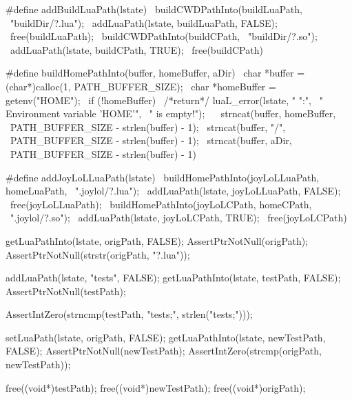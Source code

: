 #define addBuildLuaPath(lstate)            \
  buildCWDPathInto(buildLuaPath,           \
    "buildDir/?.lua");                     \
  addLuaPath(lstate, buildLuaPath, FALSE); \
  free(buildLuaPath);                      \
  buildCWDPathInto(buildCPath,             \
    "buildDir/?.so");                      \
  addLuaPath(lstate, buildCPath, TRUE);    \
  free(buildCPath)
  
#define buildHomePathInto(buffer, homeBuffer, aDir)     \
  char *buffer = (char*)calloc(1, PATH_BUFFER_SIZE);    \
  char *homeBuffer = getenv("HOME");                    \
  if (!homeBuffer) {                                    \
    /*return*/ luaL_error(lstate, "%
      "\nERROR:\n",                                     \
      "  Environment variable 'HOME'\n",                \
      "  is empty!\n\n");                               \
  }                                                     \
  strncat(buffer, homeBuffer,                           \
    PATH_BUFFER_SIZE - strlen(buffer) - 1);             \
  strncat(buffer, "/",                                  \
    PATH_BUFFER_SIZE - strlen(buffer) - 1);             \
  strncat(buffer, aDir,                                 \
    PATH_BUFFER_SIZE - strlen(buffer) - 1)

#define addJoyLoLLuaPath(lstate)                 \
  buildHomePathInto(joyLoLLuaPath, homeLuaPath,  \
    ".joylol/?.lua");                            \
  addLuaPath(lstate, joyLoLLuaPath, FALSE);      \
  free(joyLoLLuaPath);                           \
  buildHomePathInto(joyLoLCPath, homeCPath,      \
    ".joylol/?.so");                             \
  addLuaPath(lstate, joyLoLCPath, TRUE);         \
  free(joyLoLCPath)
\stopCHeader


\startCTest
  getLuaPathInto(lstate, origPath, FALSE);
  AssertPtrNotNull(origPath);
  AssertPtrNotNull(strstr(origPath, "?.lua"));

  addLuaPath(lstate, "tests", FALSE);
  getLuaPathInto(lstate, testPath, FALSE);
  AssertPtrNotNull(testPath);

  AssertIntZero(strncmp(testPath, "tests;", strlen("tests;")));
  
  setLuaPath(lstate, origPath, FALSE);
  getLuaPathInto(lstate, newTestPath, FALSE);
  AssertPtrNotNull(newTestPath);
  AssertIntZero(strcmp(origPath, newTestPath));

  free((void*)testPath);
  free((void*)newTestPath);
  free((void*)origPath);
\stopCTest
\stopTestCase

